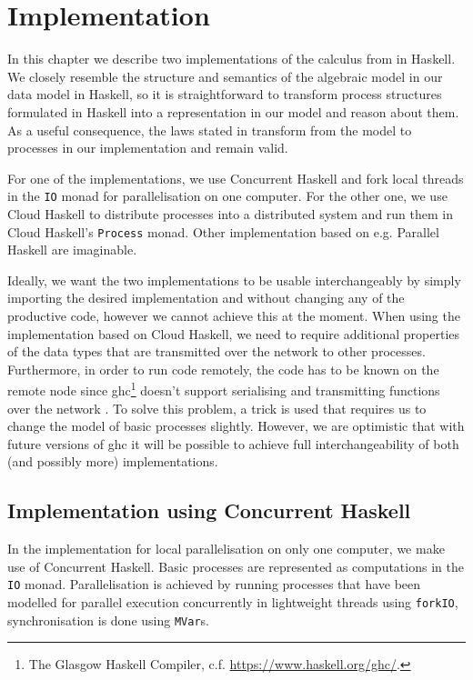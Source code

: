 \chapter{Implementation}
\label{chp:implementation}
In this chapter we describe two implementations of the calculus from  in \textsf{Haskell}. We closely resemble the structure and semantics of the algebraic model in our data model in \textsf{Haskell}, so it is straightforward to transform process structures formulated in \textsf{Haskell} into a representation in our model and reason about them. As a useful consequence, the laws stated in  transform from the model to processes in our implementation and remain valid.

For one of the implementations, we use \textsf{Concurrent Haskell} and fork local threads in the \texttt{IO} monad for parallelisation on one computer. For the other one, we use \textsf{Cloud Haskell} to distribute processes into a distributed system and run them in \textsf{Cloud Haskell}'s \texttt{Process} monad. Other implementation based on e.g. \textsf{Parallel Haskell} are imaginable.

Ideally, we want the two implementations to be usable interchangeably by simply importing the desired implementation and without changing any of the productive code, however we cannot achieve this at the moment. When using the implementation based on \textsf{Cloud Haskell}, we need to require additional properties of the data types that are transmitted over the network to other processes. Furthermore, in order to run code remotely, the code has to be known on the remote node since \textsf{ghc}\footnote{The Glasgow Haskell Compiler, c.f. \url{https://www.haskell.org/ghc/}.} doesn't support serialising and transmitting functions over the network \cite{Epstein:2011:THC:2034675.2034690}. To solve this problem, a trick is used that requires us to change the model of basic processes slightly. However, we are optimistic that with future versions of \textsf{ghc} it will be possible to achieve full interchangeability of both (and possibly more) implementations.



\clearpage

\section{Implementation using Concurrent Haskell}
\label{chp:local}
In the implementation for local parallelisation on only one computer, we make use of \textsf{Concurrent Haskell}. Basic processes are represented as computations in the \texttt{IO} monad. Parallelisation is achieved by running processes that have been modelled for parallel execution concurrently in lightweight threads using \texttt{forkIO}, synchronisation is done using \texttt{MVar}s.


